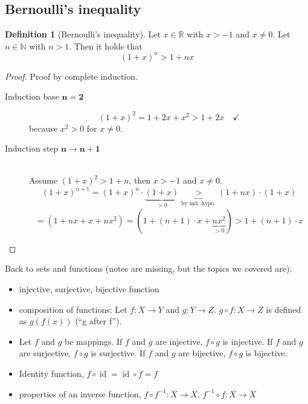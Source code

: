 \documentclass[a4paper,landscape,twocolumn]{article}
\theoremstyle{definition}
\newtheorem{defi}{Definition}
\begin{document}
\subsection{Bernoulli's inequality}
%
\begin{defi}[Bernoulli's inequality]
  Let $x \in \mathbb R$ with $x > -1$ and $x \neq 0$.
  Let $n \in \mathbb N$ with $n > 1$. Then it holds that
  \[ (1 + x)^n > 1 + nx \]
\end{defi}
\begin{proof}
  Proof by complete induction.
  \begin{description}
    \item[Induction base $\mathbf{n = 2}$]
      \[ (1 + x)^2 = 1 + 2x + x^2 > 1 + 2x \quad\checkmark \]
      because $x^2 > 0$ for $x \neq 0$.
    \item[Induction step $\mathbf{n \rightarrow n+1}$] \hfill{} \\
      Assume $(1+x)^2 > 1 + n$, then $x > -1$ and $x \neq 0$.
      \[ (1 + x)^{n+1} = (1 + x)^n \cdot \underbrace{(1 + x)}_{>0} \underbrace{>}_{\text{by ind. hypo.}} (1+nx) \cdot (1 + x) \]
      \[ = (1 + nx + x + nx^2) = (1 + (n+1)\cdot x + \underbrace{nx^2}_{>0}) > 1 + (n + 1) \cdot x \]
  \end{description}
\end{proof}

Back to sets and functions (notes are missing, but the topics we covered are):
\begin{itemize}
  \item injective, surjective, bijective function
  \item composition of functions: Let $f: X \rightarrow Y$ and $g: Y \rightarrow Z$. $g \circ f: X \rightarrow Z$ is defined as $g(f(x))$ (\enquote{g after f}).
  \item Let $f$ and $g$ be mappings. If $f$ and $g$ are injective, $f \circ g$ is injective. If $f$ and $g$ are surjective, $f \circ g$ is surjective. If $f$ and $g$ are bijective, $f \circ g$ is bijective.
  \item Identity function, $f \circ \operatorname{id} = \operatorname{id} \circ f = f$
  \item properties of an inverse function, $f \circ f^{-1}: X \rightarrow X$, $f^{-1} \circ f: X \rightarrow X$
\end{itemize}
\end{document}
